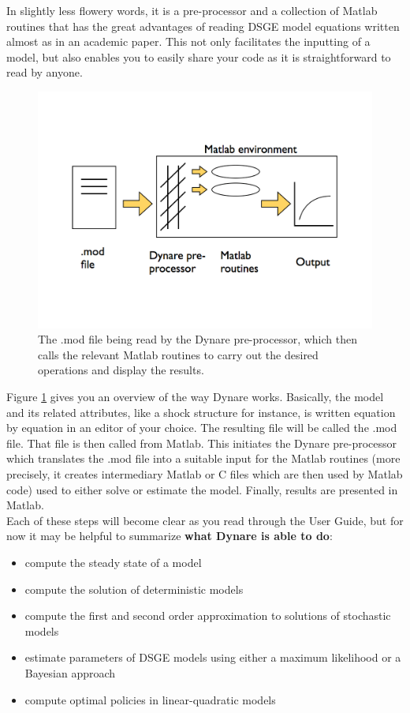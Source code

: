 In slightly less flowery words, it is a pre-processor and a collection of Matlab routines that has the great advantages of reading DSGE model equations written almost as in an academic paper. This not only facilitates the inputting of a model, but also enables you to easily share your code as it is straightforward to read by anyone.\\
\begin{figure} \label{fig:dyn}
\begin{center} 
\includegraphics[width=1.0\textwidth]{P_DynareStruct2} 
\end{center} 
\caption[Dynare, a bird's eyeview]{The .mod file being read by the Dynare pre-processor, which then calls the relevant Matlab routines to carry out the desired operations and display the results.} 
\end{figure}

Figure \ref{fig:dyn} gives you an overview of the way Dynare works. Basically, the model and its related attributes, like a shock structure for instance, is written equation by equation in an editor of your choice. The resulting file will be called the .mod file. That file is then called from Matlab. This initiates the Dynare pre-processor which translates the .mod file into a suitable input for the Matlab routines (more precisely, it creates intermediary Matlab or C files which are then used by Matlab code) used to either solve or estimate the model. Finally, results are presented in Matlab.\\

Each of these steps will become clear as you read through the User Guide, but for now it may be helpful to summarize \textbf{what Dynare is able to do}:
\begin{itemize}
\item compute the steady state of a model
\item compute the solution of deterministic models
\item compute the first and second order approximation to solutions of stochastic models
\item estimate parameters of DSGE models using either a maximum likelihood or a Bayesian approach
\item compute optimal policies in linear-quadratic models
\end{itemize}


